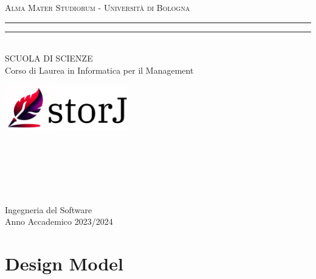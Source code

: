 \documentclass{article}
\begin{document}
\pagestyle{empty}

\begin{titlepage} 
\begin{center}
    {{\Large{\textsc{Alma Mater Studiorum - Università di Bologna}}}}
    \rule[0.1cm]{\textwidth}{0.1px}
    \rule[0.5cm]{\textwidth}{0.6px}\\
    {\large{SCUOLA DI SCIENZE \\ Corso di Laurea in Informatica per il Management}}
\end{center}

\vspace{90px}

\begin{center}
    \href{https://github.com/DavideDeRosa/storj_SWE}{\includegraphics[width=0.4\textwidth]{storJ.png}}
\end{center}

\vspace{100px}
\par
\noindent
\begin{minipage}[t]{0.04\textwidth}
~
\end{minipage}
\begin{minipage}[t]{0.4\textwidth}
\end{minipage}
\hfill
\begin{minipage}[t]{0.4\textwidth}\raggedleft
    {\
}
\end{minipage}
\begin{minipage}[t]{0.04\textwidth}
~
\end{minipage}

\vspace*{200px}

\begin{center}
    \large{Ingegneria del Software}\\
    \large{Anno Accademico 2023/2024}
\end{center}
\end{titlepage}

\section*{Design Model}
\end{document}
